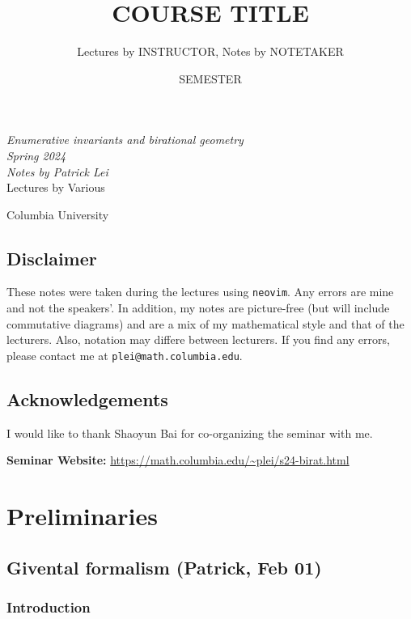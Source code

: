 \documentclass[leqno, openany]{memoir}
\title{COURSE TITLE}
\author{Lectures by INSTRUCTOR, Notes by NOTETAKER}
\date{SEMESTER}
\theoremstyle{definition}
\theoremstyle{remark}
\theoremstyle{plain}
\theoremstyle{definition}
\theoremstyle{remark}
\newcommand*{\titleSW}
    {\begingroup%
    \raggedleft
    \vspace*{\baselineskip}
    {\Huge\itshape Enumerative invariants and birational geometry\\ Spring 2024}\\[\baselineskip]
    {\large\itshape Notes by Patrick Lei}\\[0.2\textheight]
    {\Large Lectures by Various}\par
    \vfill
    {\Large \sffamily Columbia University}
    \vspace*{\baselineskip}
\endgroup}
\begin{document}
    
\begin{titlingpage}
\titleSW
\end{titlingpage}

\thispagestyle{empty}
\section*{Disclaimer}%
\label{sec:disclaimer}

These notes were taken during the lectures using \texttt{neovim}. 
Any errors are mine and not the speakers'. 
In addition, my notes are picture-free (but will include commutative diagrams) and are a mix of my mathematical style and that of the lecturers. Also, notation may differe between lecturers.
If you find any errors, please contact me at \texttt{plei@math.columbia.edu}.

\section*{Acknowledgements}
I would like to thank Shaoyun Bai for co-organizing the seminar with me.

\vspace*{1cm}

\noindent\textbf{Seminar Website:}  \url{https://math.columbia.edu/~plei/s24-birat.html}
\newpage

\tableofcontents

\chapter{Preliminaries}%
\label{cha:Preliminaries}

\section{Givental formalism (Patrick, Feb 01)}

\subsection{Introduction}
\end{document}
